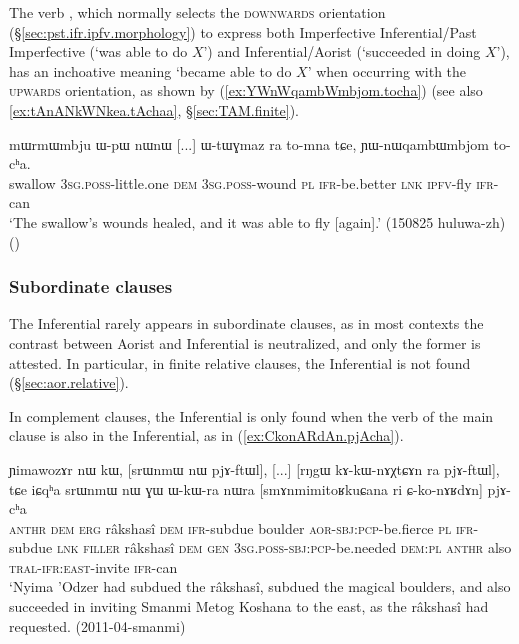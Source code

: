 The verb , which normally selects the \textsc{downwards} orientation (§\ref{sec:pst.ifr.ipfv.morphology}) to express both Imperfective Inferential/Past Imperfective (`was able to do $X$') and Inferential/Aorist (`succeeded in doing $X$'), has an inchoative meaning `became able to do $X$' when occurring with the \textsc{upwards} orientation, as shown by (\ref{ex:YWnWqambWmbjom.tocha}) (see also \ref{ex:tAnANkWNkea.tAchaa}, §\ref{sec:TAM.finite}).

\begin{exe}
\ex \label{ex:YWnWqambWmbjom.tocha}
\gll mɯrmɯmbju ɯ-pɯ nɯnɯ [...] ɯ-tɯɣmaz ra to-mna tɕe, ɲɯ-nɯqambɯmbjom to-cʰa. \\
swallow \textsc{3sg}.\textsc{poss}-little.one \textsc{dem} { } \textsc{3sg}.\textsc{poss}-wound \textsc{pl} \textsc{ifr}-be.better \textsc{lnk} \textsc{ipfv}-fly \textsc{ifr}-can \\
\glt `The swallow's wounds healed, and it was able to fly [again].' (150825 huluwa-zh)
()
\end{exe}

\subsubsection{Subordinate clauses}  \label{sec:pst.ifr.subordinate}
The Inferential rarely appears in subordinate clauses, as in most contexts the contrast between Aorist and Inferential is neutralized, and only the former is attested. In particular, in finite relative clauses, the Inferential is not found (§\ref{sec:aor.relative}). 

In complement clauses, the Inferential is only found when the verb of the main clause is also in the Inferential, as in (\ref{ex:CkonARdAn.pjAcha}). 


\begin{exe}
\ex \label{ex:CkonARdAn.pjAcha}
 \gll  ɲimawozɤr nɯ kɯ, [srɯnmɯ nɯ pjɤ-ftɯl], [...] [rŋgɯ kɤ-kɯ-nɤχtɕɤn ra pjɤ-ftɯl],
tɕe iɕqʰa srɯnmɯ nɯ ɣɯ ɯ-kɯ-ra nɯra [smɤnmimitoʁkuɕana ri ɕ-ko-nɤʁdɤn] pjɤ-cʰa \\
\textsc{anthr} \textsc{dem} \textsc{erg} râkshasî \textsc{dem} \textsc{ifr}-subdue { } boulder \textsc{aor}-\textsc{sbj}:\textsc{pcp}-be.fierce \textsc{pl} \textsc{ifr}-subdue \textsc{lnk} \textsc{filler} râkshasî \textsc{dem} \textsc{gen} \textsc{3sg}.\textsc{poss}-\textsc{sbj}:\textsc{pcp}-be.needed \textsc{dem}:\textsc{pl}  \textsc{anthr} also \textsc{tral}-\textsc{ifr}:\textsc{east}-invite \textsc{ifr}-can \\
\glt `Nyima 'Odzer had subdued the râkshasî, subdued the magical boulders, and also succeeded in inviting Smanmi Metog Koshana to the east, as the râkshasî had requested. (2011-04-smanmi)
\end{exe}

